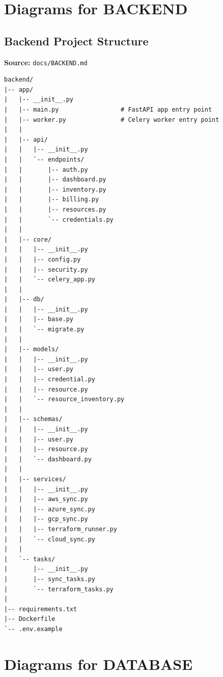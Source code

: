 \section{Diagrams for BACKEND}

\subsection{Backend Project Structure}
\textbf{Source:} \texttt{docs/BACKEND.md}
\begin{lstlisting}[numbers=none,basicstyle=\ttfamily\tiny,caption={Backend Project Structure Adapted from docs/BACKEND.md}]
backend/
|-- app/
|   |-- __init__.py
|   |-- main.py                 # FastAPI app entry point
|   |-- worker.py               # Celery worker entry point
|   |
|   |-- api/
|   |   |-- __init__.py
|   |   `-- endpoints/
|   |       |-- auth.py
|   |       |-- dashboard.py
|   |       |-- inventory.py
|   |       |-- billing.py
|   |       |-- resources.py
|   |       `-- credentials.py
|   |
|   |-- core/
|   |   |-- __init__.py
|   |   |-- config.py
|   |   |-- security.py
|   |   `-- celery_app.py
|   |
|   |-- db/
|   |   |-- __init__.py
|   |   |-- base.py
|   |   `-- migrate.py
|   |
|   |-- models/
|   |   |-- __init__.py
|   |   |-- user.py
|   |   |-- credential.py
|   |   |-- resource.py
|   |   `-- resource_inventory.py
|   |
|   |-- schemas/
|   |   |-- __init__.py
|   |   |-- user.py
|   |   |-- resource.py
|   |   `-- dashboard.py
|   |
|   |-- services/
|   |   |-- __init__.py
|   |   |-- aws_sync.py
|   |   |-- azure_sync.py
|   |   |-- gcp_sync.py
|   |   |-- terraform_runner.py
|   |   `-- cloud_sync.py
|   |
|   `-- tasks/
|       |-- __init__.py
|       |-- sync_tasks.py
|       `-- terraform_tasks.py
|
|-- requirements.txt
|-- Dockerfile
`-- .env.example
\end{lstlisting}

\section{Diagrams for DATABASE}

